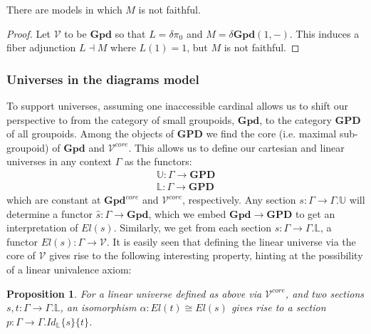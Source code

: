 \documentclass[a4paper,english]{lipics-v2018}
\newtheorem{proposition}[theorem]{Proposition}
\begin{document}
\begin{theorem}\label{M-faith}There are models in which $M$ is not faithful.
  \begin{proof}
    Let $\mathcal{V}$ to be $\mathbf{Gpd}$ so that $L = \delta \pi_0$ and $M = \delta \mathbf{Gpd}(1, -)$. This induces a fiber adjunction $L \dashv M$ where $L(1) = 1$, but $M$ is not faithful.
  \end{proof}
\end{theorem}
\subsubsection{Universes in the diagrams model}
To support universes, assuming one inaccessible cardinal allows us to shift our perspective to from the category of small groupoids, $\mathbf{Gpd}$, to the category $\mathbf{GPD}$ of all groupoids. Among the objects of $\mathbf{GPD}$ we find the core (i.e. maximal sub-groupoid) of $\mathbf{Gpd}$ and $\mathcal{V}^{core}$. This allows us to define our cartesian and linear universes in any context $\Gamma$ as the functors:
\[
  \begin{split}
    \mathbb{U} :  \Gamma \to \mathbf{GPD}\\
    \mathbb{L} : \Gamma \to \mathbf{GPD}
  \end{split}
\]
which are constant at $\mathbf{Gpd}^{core}$ and $\mathcal{V}^{core}$, respectively. Any section $s : \Gamma \to \Gamma.\mathbb{U}$ will determine a functor $\hat s : \Gamma \to \mathbf{Gpd}$, which we  embed $\mathbf{Gpd} \to \mathbf{GPD}$ to get an interpretation of $El(s)$. Similarly, we get from each section $s : \Gamma \to \Gamma.\mathbb{L}$, a functor $El(s) : \Gamma \to \mathcal{V}$. 
It is easily seen that defining the linear universe via the core of $\mathcal{V}$ gives rise to the following interesting property, hinting at the possibility of a linear univalence axiom:
\begin{proposition}For a linear universe defined as above via $\mathcal{V}^{core}$, and two sections $s, t : \Gamma \to \Gamma.\mathbb{L}$, an isomorphism $\alpha : El(t) \cong El(s)$ gives rise to a section $p : \Gamma \to \Gamma.Id_{\mathbb{L}}\{s\}\{t\}$.
\end{proposition}
\end{document}
